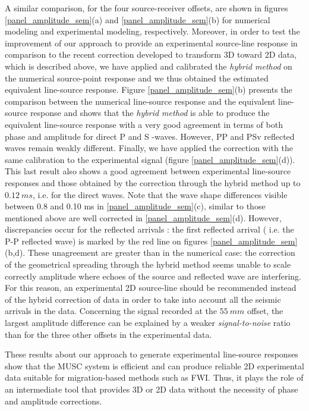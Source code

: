 \documentclass[manuscript,revised]{geophysics}
\begin{document}
\noindent A similar comparison, for the four source-receiver offsets, are shown in figures \ref{panel_amplitude_sem}(a) and \ref{panel_amplitude_sem}(b) for numerical modeling and experimental modeling, respectively. Moreover, in order to test the improvement of our approach to provide an experimental source-line response in comparison to the recent correction developed to transform 3D toward 2D data, which is described above, we have applied and calibrated the \textit{hybrid method} \citep{Forbriger_LSS_2014,Schafer_LSS_2014} on the numerical source-point response and we thus obtained the estimated equivalent line-source response. Figure \ref{panel_amplitude_sem}(b) presents the comparison between the numerical line-source response and the equivalent line-source response and shows that the \textit{hybrid method} is able to produce the equivalent line-source response with a very good agreement in terms of both phase and amplitude for direct P and S -waves.  However, PP and PSv reflected waves remain weakly different. Finally, we have applied the correction with the same calibration to the experimental signal (figure \ref{panel_amplitude_sem}(d)). This last result also shows a good agreement between experimental line-source responses and those obtained by the correction through the hybrid method up to $0.12\ ms$, i.e. for the direct waves. Note that the wave shape differences visible between 0.8 and 0.10 ms in \ref{panel_amplitude_sem}(c), similar to those mentioned above are well corrected in \ref{panel_amplitude_sem}(d).
However, discrepancies occur for the reflected arrivals : the first reflected arrival ( i.e. the P-P reflected wave) is marked by the red line on figures \ref{panel_amplitude_sem}(b,d). These unagreement are greater than in the numerical case: the correction of the geometrical spreading through the hybrid method seems unable to scale correctly amplitude where echoes of the source and reflected wave are interfering. For this reason, an experimental 2D source-line should be recommended instead of the hybrid correction of data in order to take into account all the seismic arrivals in the data.  Concerning the signal recorded at the $55\ mm$ offset, the largest amplitude difference can be explained by a weaker \textit{signal-to-noise} ratio than for the three other offsets in the experimental data.  

\noindent These results about our approach to generate experimental line-source responses show that the MUSC system is efficient and can produce reliable 2D experimental data suitable for migration-based methods such as FWI. Thus, it plays the role of an intermediate tool that provides 3D or 2D data without the necessity of phase and amplitude corrections.
\end{document}
